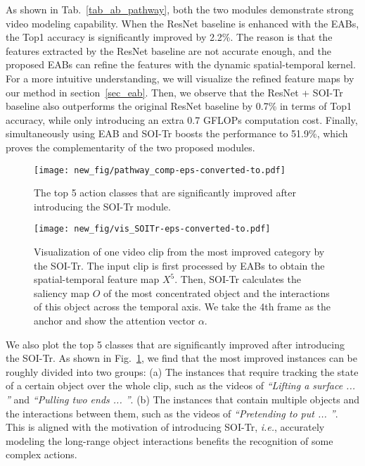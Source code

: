 As shown in Tab.~\ref{tab_ab_pathway}, both the two modules demonstrate strong video modeling capability.
When the ResNet baseline is enhanced with the EABs, the Top1 accuracy is significantly improved by 2.2\%. The reason is that the features extracted by the ResNet baseline are not accurate enough, and the proposed EABs can refine the features with the dynamic spatial-temporal kernel.
For a more intuitive understanding, we will visualize
the refined feature maps by our method in section~\ref{sec_eab}.
Then, we observe that the ResNet + SOI-Tr baseline also outperforms the original ResNet baseline by 0.7\% in terms of Top1 accuracy, while only introducing an extra 0.7 GFLOPs computation cost.
Finally, simultaneously using EAB and SOI-Tr boosts the performance to 51.9\%, which proves the complementarity of the two proposed modules.



\begin{figure}[!htb]
	\centering
	\begin{minipage}[t]{0.76\linewidth}
		\centering
		\centerline{\texttt{[image: new\_fig/pathway\_comp-eps-converted-to.pdf]}}
	\end{minipage}
	\caption {
		The top 5 action classes that are significantly improved after introducing the SOI-Tr module.
	}
	\label{fig_ab_pathway_comp}
\end{figure}



\begin{figure}[!thp]
	\centering
	\begin{minipage}[t]{0.74\linewidth}
		\centering
		\centerline{\texttt{[image: new\_fig/vis\_SOITr-eps-converted-to.pdf]}}
	\end{minipage}
	\caption {
		Visualization of one video clip from the most improved category by the SOI-Tr.
		The input clip is first processed by EABs to obtain the spatial-temporal feature map {$X^5$}.
		Then, SOI-Tr calculates the saliency map {$O$} of the most concentrated object and the interactions of this object across the temporal axis. We take the 4th frame as the anchor and show the attention vector {$\alpha$}.
	}
	\spaceabovetab
	\label{fig_vis_ean_soitr}
\end{figure}
We also plot the top 5 classes that are significantly improved after introducing the SOI-Tr. As shown in Fig.~\ref{fig_ab_pathway_comp},
we find that the most improved instances can be roughly divided into two groups:
{(a)} The instances that require tracking the state of a certain object over the whole clip, such as the videos of \textit{``Lifting a surface ... ''} and \textit{``Pulling two ends ... ''}.
{(b)} The instances that contain multiple objects and the interactions between them, such as the videos of \textit{``Pretending to put ... ''}.
This is aligned with the motivation of introducing SOI-Tr, \textit{i.e.}, accurately modeling the long-range object interactions benefits the recognition of some complex actions.




